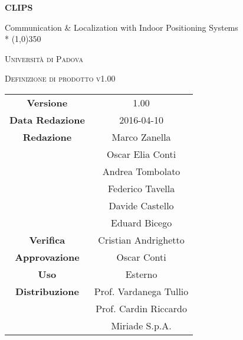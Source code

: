 \documentclass[a4paper,12pt]{article}
\author{}
\date{03/03/2016}
\begin{document}
\begin{titlepage}
	\centering
	{\huge\bfseries CLIPS\par}
	Communication \& Localization with Indoor Positioning Systems \\*
	\line(1,0){350} \\
	{\scshape\LARGE Università di Padova \par}
	\vspace{1cm}
	{\scshape\Large Definizione di prodotto v1.00\par}
	\logo
	
	\vfill \vfill
		\begin{tabular}{c|c}
			{\hfill \textbf{Versione}} 			& 1.00				\\
			{\hfill\textbf{Data Redazione}} 	& 2016-04-10	\\
			{\hfill\textbf{Redazione}} 			& Marco Zanella \\
												& Oscar Elia Conti \\
												& Andrea Tombolato \\
												& Federico Tavella \\
												& Davide Castello \\
												& Eduard Bicego 	\\ 
			{\hfill\textbf{Verifica}} 			& Cristian Andrighetto \\
			{\hfill\textbf{Approvazione}} 		& Oscar Conti		\\ 
			{\hfill\textbf{Uso}} 				& Esterno			\\ 
			{\hfill\textbf{Distribuzione}} 		& Prof. Vardanega Tullio \\
												& Prof. Cardin Riccardo \\
												& Miriade S.p.A. \\
		\end{tabular}
	\end{titlepage}
	
	\newpage
	\pagestyle{myfront}
		
	\newpage
		\tableofcontents
	\newpage
		\listoffigures	
	\label{LastFrontPage}
	\newpage
	
	\pagestyle{mymain}
	
	\newpage
		
		
	\newpage
		
		
	\newpage
			
		
	\newpage
		
		
	\newpage
		
		
	\newpage
		
		
		
	\label{LastPage}
\end{document}
